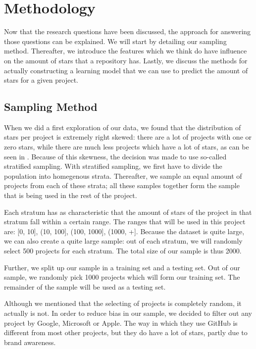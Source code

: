 \section{Methodology}
    Now that the research questions have been discussed, the approach for answering those questions can be explained.
    We will start by detailing our sampling method. 
    Thereafter, we introduce the features which we think do have influence on the amount of stars that a repository has.
    Lastly, we discuss the methods for actually constructing a learning model that we can use to predict the amount of stars for a given project.
    \subsection{Sampling Method}
        When we did a first exploration of our data, we found that the distribution of stars per project is extremely right skewed: there are a lot of projects with one or zero stars, while there are much less projects which have a lot of stars, as can be seen in .
        Because of this skewness, the decision was made to use so-called stratified sampling.
        With stratified sampling, we first have to divide the population into homegenous strata. 
        Thereafter, we sample an equal amount of projects from each of these strata; 
        all these samples together form the sample that is being used in the rest of the project.
        
        Each stratum has as characteristic that the amount of stars of the project in that stratum fall within a certain range. 
        The ranges that will be used in this project are: [0, 10], (10, 100], (100, 1000], (1000, +].
        Because the dataset is quite large, we can also create a quite large sample:         
        out of each stratum, we will randomly select 500 projects for each stratum. The total size of our sample is thus 2000.
        
        Further, we split up our sample in a training set and a testing set. Out of our sample, we randomly pick 1000 projects which will form our training set. The remainder of the sample will be used as a testing set.
        
        Although we mentioned that the selecting of projects is completely random, it actually is not. In order to reduce bias in our sample, we decided to filter out any project by Google, Microsoft or Apple. 
        The way in which they use GitHub is different from most other projects, but they do have a lot of stars, partly due to brand awareness.
        

